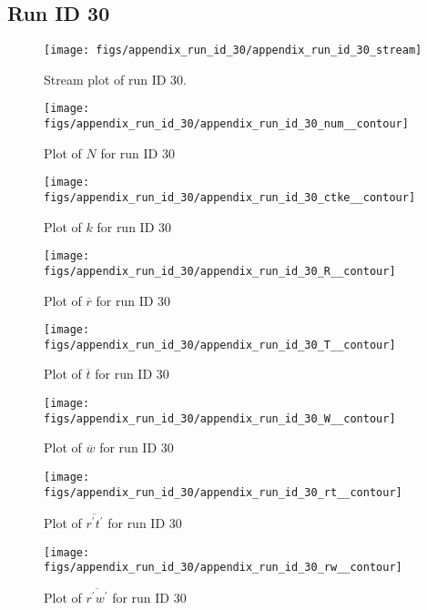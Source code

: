 \subsection{Run ID 30}
\begin{figure}[H]
\centering
\texttt{[image: figs/appendix\_run\_id\_30/appendix\_run\_id\_30\_stream]}
\caption{Stream plot of run ID 30.}
\label{fig:appendix_run_id_30_stream}
\end{figure}


\begin{figure}[H]
\centering
\texttt{[image: figs/appendix\_run\_id\_30/appendix\_run\_id\_30\_num\_\_contour]}
\caption{Plot of $N$ for run ID 30}
\label{fig:appendix_run_id_30_num__contour}
\end{figure}


\begin{figure}[H]
\centering
\texttt{[image: figs/appendix\_run\_id\_30/appendix\_run\_id\_30\_ctke\_\_contour]}
\caption{Plot of $k$ for run ID 30}
\label{fig:appendix_run_id_30_ctke__contour}
\end{figure}


\begin{figure}[H]
\centering
\texttt{[image: figs/appendix\_run\_id\_30/appendix\_run\_id\_30\_R\_\_contour]}
\caption{Plot of $\overline{r}$ for run ID 30}
\label{fig:appendix_run_id_30_R__contour}
\end{figure}


\begin{figure}[H]
\centering
\texttt{[image: figs/appendix\_run\_id\_30/appendix\_run\_id\_30\_T\_\_contour]}
\caption{Plot of $\overline{t}$ for run ID 30}
\label{fig:appendix_run_id_30_T__contour}
\end{figure}


\begin{figure}[H]
\centering
\texttt{[image: figs/appendix\_run\_id\_30/appendix\_run\_id\_30\_W\_\_contour]}
\caption{Plot of $\overline{w}$ for run ID 30}
\label{fig:appendix_run_id_30_W__contour}
\end{figure}


\begin{figure}[H]
\centering
\texttt{[image: figs/appendix\_run\_id\_30/appendix\_run\_id\_30\_rt\_\_contour]}
\caption{Plot of $\overline{r^\prime t^\prime}$ for run ID 30}
\label{fig:appendix_run_id_30_rt__contour}
\end{figure}


\begin{figure}[H]
\centering
\texttt{[image: figs/appendix\_run\_id\_30/appendix\_run\_id\_30\_rw\_\_contour]}
\caption{Plot of $\overline{r^\prime w^\prime}$ for run ID 30}
\label{fig:appendix_run_id_30_rw__contour}
\end{figure}


